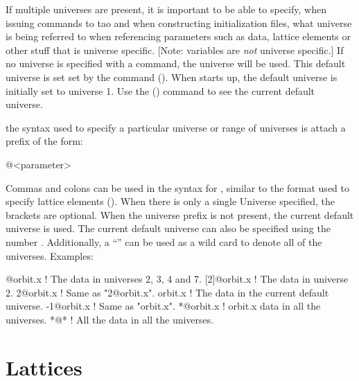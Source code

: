 If multiple universes are present, it is important to be able to specify, when issuing commands to
tao and when constructing \tao initialization files, what universe is being referred to when
referencing parameters such as data, lattice elements or other stuff that is universe
specific. [Note: \tao variables are {\em not} universe specific.] If no universe is specified with a
command, the  universe will be used. This default universe is set set by the  command (). When \tao starts up, the default universe is initially set
to universe 1. Use the  () command to see the current default universe.

the syntax used to specify a particular universe or range of universes is attach a prefix of the
form:
\begin{example}
  @<parameter>
\end{example}
Commas and colons can be used in the syntax for , similar to the  format used to specify lattice elements ().  When there is only a
single Universe specified, the brackets \vn{[...]} are optional. When the universe prefix is not
present, the current default universe is used. The current default universe can also be specified
using the number . Additionally, a ``\vn{*}'' can be used as a wild card to denote all of the
universes. Examples:
\begin{example}
  [2:4,7]@orbit.x ! The  data in universes 2, 3, 4 and 7.
  [2]@orbit.x     ! The  data in universe 2. 
  2@orbit.x       ! Same as "2@orbit.x".
  orbit.x         ! The  data in the current default universe.
  -1@orbit.x      ! Same as "orbit.x".
  *@orbit.x       ! orbit.x data in all the universes.
  *@*             ! All the data in all the universes. 
\end{example}

\section{Lattices}
\label{s:lattice}

